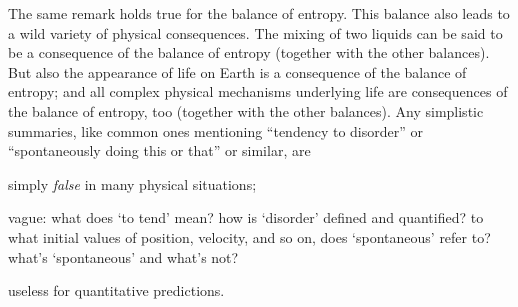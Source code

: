 \documentclass[a4paper,12pt,%
onecolumn,oneside,%
british%
]{memoir}
\renewcommand*{\|}[1][]{\nonscript\:#1\vert\nonscript\:\mathopen{}}
\begin{document}
%
%
The same remark holds true for the balance of entropy. This balance also leads to a wild variety of physical consequences. The mixing of two liquids can be said to be a consequence of the balance of entropy (together with the other balances). But also the appearance of life on Earth is a consequence of the balance of entropy; and all complex physical mechanisms underlying life are consequences of the balance of entropy, too (together with the other balances). Any simplistic summaries, like common ones mentioning \enquote{tendency to disorder} or \enquote{spontaneously doing this or that} or similar, are
\begin{enumerate*}[label=(\alph*)]
\item simply \emph{false} in many physical situations; \item vague: what does \enquote*{to tend} mean? how is \enquote*{disorder} defined and quantified? to what initial values of position, velocity, and so on, does \enquote*{spontaneous} refer to? what's \enquote*{spontaneous} and what's not? \item useless for quantitative predictions.
\end{enumerate*}
\end{document}

